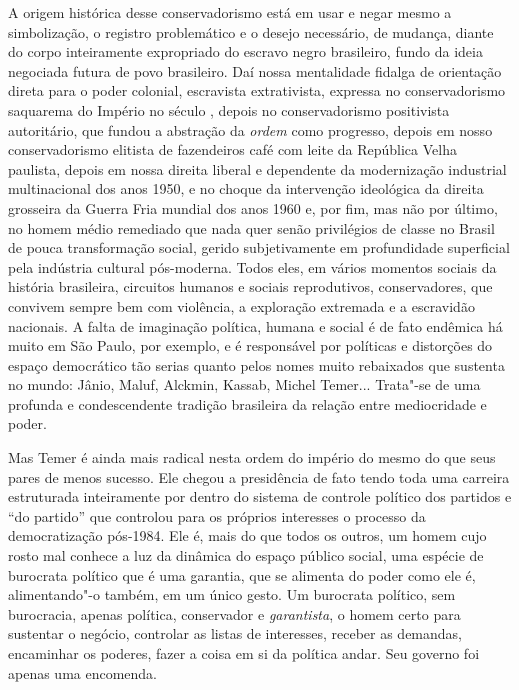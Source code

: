A origem histórica desse conservadorismo está em usar e negar mesmo a
simbolização, o registro problemático e o desejo necessário, de mudança,
diante do corpo inteiramente expropriado do escravo negro brasileiro, fundo da
ideia negociada futura de povo brasileiro. Daí nossa mentalidade fidalga de
orientação direta para o poder colonial, escravista extrativista,
expressa no conservadorismo saquarema do Império no século , depois
no conservadorismo positivista autoritário, que fundou a abstração da \emph{ordem}
como progresso, depois em nosso conservadorismo elitista de
fazendeiros café com leite da República Velha paulista, depois em nossa
direita liberal e dependente da modernização industrial multinacional dos anos 1950, e
no choque da intervenção ideológica da direita grosseira da Guerra Fria
mundial dos anos 1960 e, por fim, mas não por último, no homem médio remediado que
nada quer senão privilégios de classe no Brasil de pouca transformação
social, gerido subjetivamente em profundidade superficial pela indústria
cultural pós-moderna. Todos eles, em vários momentos sociais da
história brasileira, circuitos humanos e sociais reprodutivos,
conservadores, que convivem sempre bem com violência, a exploração
extremada e a escravidão nacionais. A falta de imaginação política,
humana e social é de fato endêmica há muito em São Paulo, por exemplo, e
é responsável por políticas e distorções do espaço democrático tão
serias quanto pelos nomes muito rebaixados que sustenta no mundo: Jânio,
Maluf, Alckmin, Kassab, Michel Temer... Trata"-se de uma profunda e
condescendente tradição brasileira da relação entre mediocridade e
poder.

Mas Temer é ainda mais radical nesta ordem do império do mesmo do que
seus pares de menos sucesso. Ele chegou a presidência de fato tendo toda
uma carreira estruturada inteiramente por dentro do sistema de controle
político dos partidos e ``do partido'' que controlou para os próprios
interesses o processo da democratização pós-1984. Ele é, mais do que
todos os outros, um homem cujo rosto mal conhece a luz da dinâmica do
espaço público social, uma espécie de burocrata político que é uma
garantia, que se alimenta do poder como ele é, alimentando"-o também, em
um único gesto. Um burocrata político, sem burocracia, apenas política,
conservador e \emph{garantista}, o homem certo para sustentar o negócio,
controlar as listas de interesses, receber as demandas, encaminhar os
poderes, fazer a coisa em si da política andar. Seu governo foi apenas
uma encomenda.

